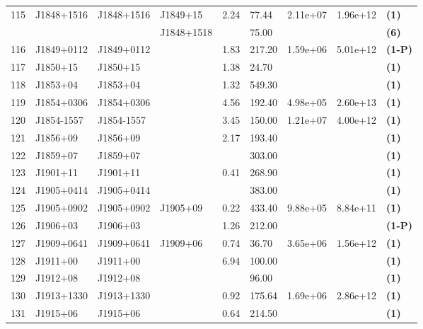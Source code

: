 \documentclass{jaa}
\begin{document}
\begin{table*}
\begin{minipage}{0.95\textwidth}
\begin{tabular}{|l|l|l|l|l|l|l|l|l|}
 115 & J1848+1516  & J1848+1516  &  J1849+15   &  2.24 &  77.44 &  2.11e+07  & 1.96e+12 &  {\bf (1)}   \\
     &             &             &  J1848+1518 &       &  75.00 &            &          &  {\bf (6)}   \\
 116 & J1849+0112  & J1849+0112  &             &  1.83 & 217.20 &  1.59e+06  & 5.01e+12 &  {\bf (1-P)} \\
 117 & J1850+15    & J1850+15    &             &  1.38 &  24.70 &            &          &  {\bf (1)}   \\
 118 & J1853+04    & J1853+04    &             &  1.32 & 549.30 &            &          &  {\bf (1)}   \\
 119 & J1854+0306  & J1854+0306  &             &  4.56 & 192.40 &  4.98e+05  & 2.60e+13 &  {\bf (1)}   \\
 120 & J1854-1557  & J1854-1557  &             &  3.45 & 150.00 &  1.21e+07  & 4.00e+12 &  {\bf (1)}   \\
 121 & J1856+09    & J1856+09    &             &  2.17 & 193.40 &            &          &  {\bf (1)}   \\
 122 & J1859+07    & J1859+07    &             &       & 303.00 &            &          &  {\bf (1)}   \\
 123 & J1901+11    & J1901+11    &             &  0.41 & 268.90 &            &          &  {\bf (1)}   \\
 124 & J1905+0414  & J1905+0414  &             &       & 383.00 &            &          &  {\bf (1)}   \\
 125 & J1905+0902  & J1905+0902  &  J1905+09   &  0.22 & 433.40 &  9.88e+05  & 8.84e+11 &  {\bf (1)}   \\
 126 & J1906+03    & J1906+03    &             &  1.26 & 212.00 &            &          &  {\bf (1-P)} \\
 127 & J1909+0641  & J1909+0641  &  J1909+06   &  0.74 &  36.70 &  3.65e+06  & 1.56e+12 &  {\bf (1)}   \\
 128 & J1911+00    & J1911+00    &             &  6.94 & 100.00 &            &          &  {\bf (1)}   \\
 129 & J1912+08    & J1912+08    &             &       &  96.00 &            &          &  {\bf (1)}   \\
 130 & J1913+1330  & J1913+1330  &             &  0.92 & 175.64 &  1.69e+06  & 2.86e+12 &  {\bf (1)}   \\
 131 & J1915+06    & J1915+06    &             &  0.64 & 214.50 &            &          &  {\bf (1)}   \\

\end{tabular}
\end{minipage}
\end{table*}
\end{document}
